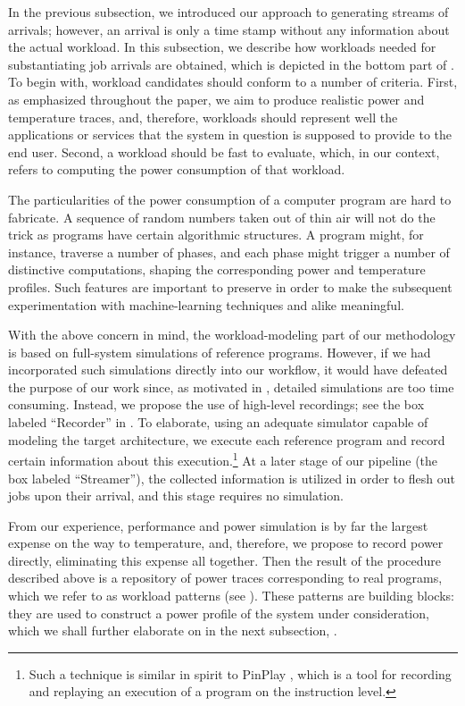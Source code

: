 In the previous subsection, we introduced our approach to generating streams of
arrivals; however, an arrival is only a time stamp without any information about
the actual workload. In this subsection, we describe how workloads needed for
substantiating job arrivals are obtained, which is depicted in the bottom part
of . To begin with, workload candidates should conform to a
number of criteria. First, as emphasized throughout the paper, we aim to produce
realistic power and temperature traces, and, therefore, workloads should
represent well the applications or services that the system in question is
supposed to provide to the end user. Second, a workload should be fast to
evaluate, which, in our context, refers to computing the power consumption of
that workload.

The particularities of the power consumption of a computer program are hard to
fabricate. A sequence of random numbers taken out of thin air will not do the
trick as programs have certain algorithmic structures. A program might, for
instance, traverse a number of phases, and each phase might trigger a number of
distinctive computations, shaping the corresponding power and temperature
profiles. Such features are important to preserve in order to make the
subsequent experimentation with machine-learning techniques and alike
meaningful.

With the above concern in mind, the workload-modeling part of our methodology is
based on full-system simulations of reference programs. However, if we had
incorporated such simulations directly into our workflow, it would have defeated
the purpose of our work since, as motivated in , detailed
simulations are too time consuming. Instead, we propose the use of high-level
recordings; see the box labeled ``Recorder'' in . To
elaborate, using an adequate simulator capable of modeling the target
architecture, we execute each reference program and record certain information
about this execution.\footnote{Such a technique is similar in spirit to PinPlay
\cite{patil2010}, which is a tool for recording and replaying an execution of a
program on the instruction level.} At a later stage of our pipeline (the box
labeled ``Streamer''), the collected information is utilized in order to flesh
out jobs upon their arrival, and this stage requires no simulation.

From our experience, performance and power simulation is by far the largest
expense on the way to temperature, and, therefore, we propose to record power
directly, eliminating this expense all together. Then the result of the
procedure described above is a repository of power traces corresponding to real
programs, which we refer to as workload patterns (see ). These
patterns are building blocks: they are used to construct a power profile of the
system under consideration, which we shall further elaborate on in the next
subsection, .

